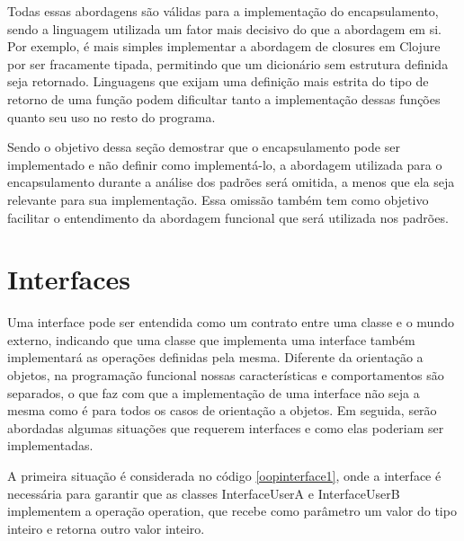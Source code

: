 Todas essas abordagens são válidas para a 
implementação do encapsulamento, sendo a 
linguagem utilizada um fator mais decisivo 
do que a abordagem em si. Por exemplo, é 
mais simples implementar a abordagem de closures 
em Clojure por ser fracamente tipada, 
permitindo que um dicionário sem estrutura 
definida seja retornado. Linguagens que exijam 
uma definição mais estrita do tipo de retorno 
de uma função podem dificultar tanto a 
implementação dessas funções quanto seu uso 
no resto do programa.

Sendo o objetivo dessa seção demostrar que 
o encapsulamento pode ser implementado e 
não definir como implementá-lo, 
a abordagem utilizada para o encapsulamento 
durante a análise dos padrões será 
omitida, a menos que ela seja relevante para 
sua implementação. Essa omissão 
também tem como objetivo facilitar o entendimento 
da abordagem funcional que será utilizada nos padrões.

\section{Interfaces}

Uma interface pode ser entendida como um contrato 
entre uma classe e o mundo externo, indicando que 
uma classe que implementa uma interface também 
implementará as operações definidas 
pela mesma\cite{oracleooconcepts}. Diferente 
da orientação a objetos, na programação funcional 
nossas características e comportamentos são separados, 
o que faz com que a implementação de uma interface 
não seja a mesma como é para todos os casos de 
orientação a objetos. Em seguida, serão abordadas 
algumas situações que requerem interfaces e como 
elas poderiam ser implementadas.


A primeira situação é considerada no código 
\ref{oopinterface1}, 
onde a interface é necessária para garantir que as 
classes InterfaceUserA e InterfaceUserB implementem 
a operação operation, que recebe como parâmetro 
um valor do tipo inteiro e retorna outro valor 
inteiro.


